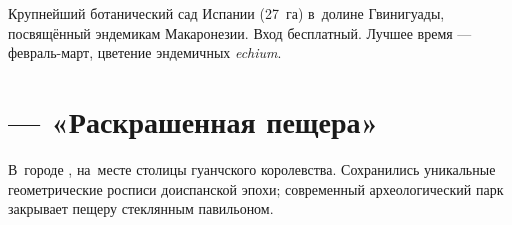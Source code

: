 \section{}

Крупнейший ботанический сад Испании (27~га) в~долине Гвинигуады,
посвящённый эндемикам Макаронезии. Вход бесплатный. Лучшее время
--- февраль-март, цветение эндемичных \textit{echium}.

\section{ --- «Раскрашенная пещера»}

В~городе , на~месте столицы гуанчского королевства.
Сохранились уникальные геометрические росписи доиспанской эпохи;
современный археологический парк закрывает пещеру стеклянным
павильоном.
